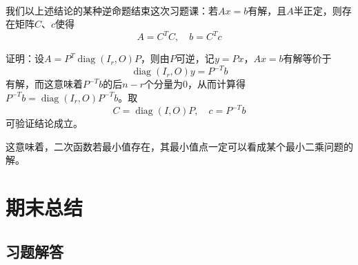 \documentclass[a4paper,UTF8,fontset=windows]{ctexart}
\DeclareMathOperator{\diag}{diag}
\begin{document}
\

我们以上述结论的某种逆命题结束这次习题课：若$Ax=b$有解，且$A$半正定，则存在矩阵$C$、$c$使得
$$A=C^TC,\quad b=C^Tc$$

证明：设$A=P^T\diag(I_r,O)P$，则由$P$可逆，记$y=Px$，$Ax=b$有解等价于
$$\diag(I_r,O)y=P^{-T}b$$
有解，而这意味着$P^{-T}b$的后$n-r$个分量为0，从而计算得$P^{-T}b=\diag(I_r,O)P^{-T}b$。取
$$C=\diag(I,O)P,\quad c=P^{-T}b$$
可验证结论成立。

这意味着，二次函数若最小值存在，其最小值点一定可以看成某个最小二乘问题的解。
\section{期末总结}
\subsection{习题解答}
\end{document}

